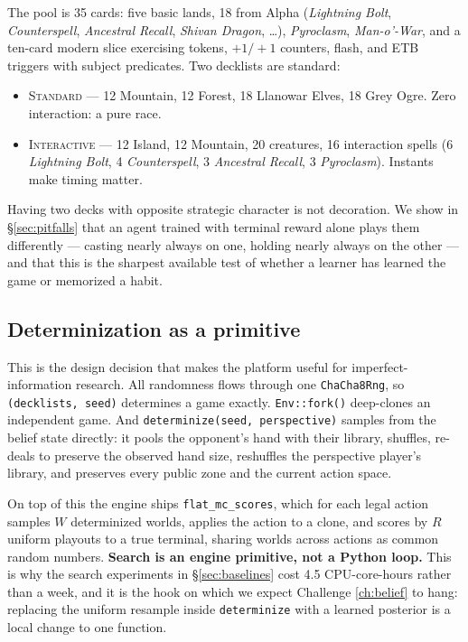 \documentclass[11pt]{article}
\newcommand{\stddeck}{\textsc{Standard}}
\newcommand{\intdeck}{\textsc{Interactive}}
\begin{document}
The pool is 35 cards: five basic lands, 18 from Alpha (\textit{Lightning Bolt}, \textit{Counterspell}, \textit{Ancestral Recall}, \textit{Shivan Dragon}, \ldots), \textit{Pyroclasm}, \textit{Man-o'-War}, and a ten-card modern slice exercising tokens, $+1/+1$ counters, flash, and ETB triggers with subject predicates. Two decklists are standard:

\begin{itemize}\itemsep1pt
\item \stddeck{} --- 12 Mountain, 12 Forest, 18 Llanowar Elves, 18 Grey Ogre. Zero interaction: a pure race.
\item \intdeck{} --- 12 Island, 12 Mountain, 20 creatures, 16 interaction spells (6 \textit{Lightning Bolt}, 4 \textit{Counterspell}, 3 \textit{Ancestral Recall}, 3 \textit{Pyroclasm}). Instants make timing matter.
\end{itemize}

Having two decks with opposite strategic character is not decoration. We show in \S\ref{sec:pitfalls} that an agent trained with terminal reward alone plays them differently --- casting nearly always on one, holding nearly always on the other --- and that this is the sharpest available test of whether a learner has learned the game or memorized a habit.

\subsection{Determinization as a primitive}
\label{sec:determinize}

This is the design decision that makes the platform useful for imperfect-information research. All randomness flows through one \texttt{ChaCha8Rng}, so \texttt{(decklists, seed)} determines a game exactly. \texttt{Env::fork()} deep-clones an independent game. And \texttt{determinize(seed, perspective)} samples from the belief state directly: it pools the opponent's hand with their library, shuffles, re-deals to preserve the observed hand size, reshuffles the perspective player's library, and preserves every public zone and the current action space.

On top of this the engine ships \texttt{flat\_mc\_scores}, which for each legal action samples $W$ determinized worlds, applies the action to a clone, and scores by $R$ uniform playouts to a true terminal, sharing worlds across actions as common random numbers. \textbf{Search is an engine primitive, not a Python loop.} This is why the search experiments in \S\ref{sec:baselines} cost 4.5 CPU-core-hours rather than a week, and it is the hook on which we expect Challenge \ref{ch:belief} to hang: replacing the uniform resample inside \texttt{determinize} with a learned posterior is a local change to one function.
\end{document}
